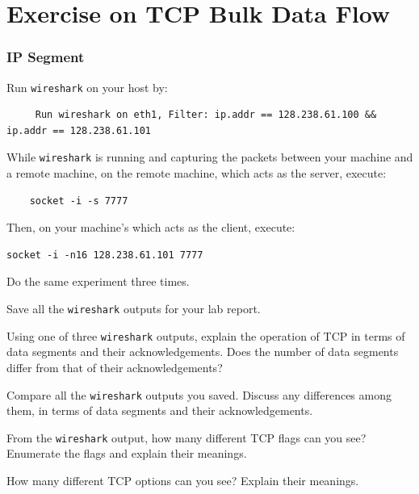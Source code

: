 \documentclass{UTNetLab}
\begin{document}
\part{Exercise on TCP Bulk Data Flow}
\section{IP Segment}
    Run \lstinline{wireshark} on your host by:
		
     \begin{lstlisting}
     Run wireshark on eth1, Filter: ip.addr == 128.238.61.100 && ip.addr == 128.238.61.101

     \end{lstlisting}  

    While \lstinline{wireshark} is running and capturing the packets between your machine and a remote machine, on the remote machine, which acts as the server, execute:

	\begin{lstlisting}
	socket -i -s 7777
	\end{lstlisting}

    Then, on your machine's which acts as the client, execute:

	\begin{lstlisting}[emph={h1,netlab}]
	socket -i -n16 128.238.61.101 7777
	\end{lstlisting}
	
    Do the same experiment three times.

    Save all the \lstinline{wireshark} outputs for your lab report.
    
    \begin{report}
        \item Using one of three \lstinline{wireshark} outputs, explain the operation of TCP in terms of data segments and their acknowledgements.
                Does the number of data segments differ from that of their acknowledgements?

            Compare all the \lstinline{wireshark} outputs you saved.
            Discuss any differences among them, in terms of data segments and their acknowledgements.
        
        \item From the \lstinline{wireshark} output, how many different TCP flags can you see? Enumerate the flags and explain their meanings.

            How many different TCP options can you see?
            Explain their meanings.
    \end{report}
\end{document}

